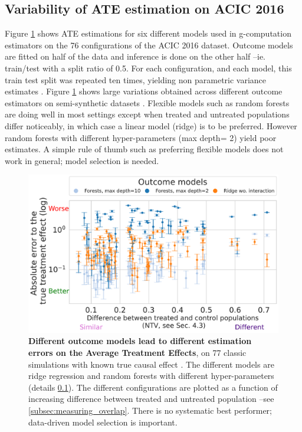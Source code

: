 \documentclass[a4paper,num-refs]{oup-contemporary}%
\begin{document}

\subsection{Variability of ATE estimation on ACIC
    2016}\label{apd:toy_example:acic_2016_ate_variability}

Figure \ref{fig:acic_2016_ate_heterogeneity} shows ATE estimations for six
different models used in g-computation estimators on the 76 configurations of
the ACIC 2016 dataset. Outcome models are fitted on half of the data and
inference is done on the other half --ie. train/test with a split ratio of 0.5.
For each configuration, and each model, this train test split was repeated ten
times, yielding non parametric variance estimates
\cite{bouthillier_accounting_2021}. Figure \ref{fig:acic_2016_ate_heterogeneity}
shows large variations obtained across different outcome estimators on
semi-synthetic datasets \cite{dorie_automated_2019}. Flexible models such as
random forests are doing well in most settings except when treated and untreated
populations differ noticeably, in which case a linear model (ridge) is to be
preferred. However random forests with different hyper-parameters (max depth= 2)
yield poor estimates. A simple rule of thumb such as preferring flexible models
does not work in general; model selection is needed.


\begin{figure}[!b]
    \centering
    \includegraphics[width=0.95\linewidth]{acic_2016_ate_hte.pdf}%
    \caption{\textbf{Different outcome models lead to different
            estimation errors on the Average Treatment Effects},
        on 77 classic simulations with known true causal effect
        \cite{dorie_automated_2019}. The different models are ridge regression
        and random forests with different hyper-parameters
        (details
        \ref{apd:toy_example:acic_2016_ate_variability}). The different configurations are
        plotted as a function of increasing difference between treated and
        untreated population --see
        \autoref{subsec:measuring_overlap}.
        There is no systematic best performer; data-driven model
        selection is important.
        \label{fig:acic_2016_ate_heterogeneity}%
    }
\end{figure}
\end{document}
